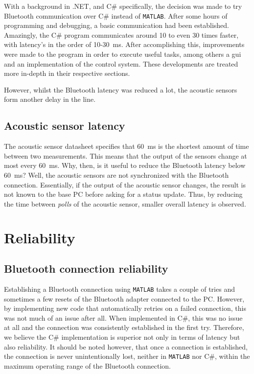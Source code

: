 \documentclass[11pt,titlepage]{report}
\begin{document}
With a background in .NET, and C\# specifically, the decision was made to try Bluetooth communication over C\# instead of \texttt{MATLAB}. After some hours of programming and debugging, a basic communication had been established. Amazingly, the C\# program communicates around 10 to even 30 times faster, with latency's in the order of \num{10}-\SI{30}{ms}. After accomplishing this, improvements were made to the program in order to execute useful tasks, among others a gui and an implementation of the control system. These developments are treated more in-depth in their respective sections.

However, whilst the Bluetooth latency was reduced a lot, the acoustic sensors form another delay in the line.
\subsection{Acoustic sensor latency}
The acoustic sensor datasheet specifies that \SI{60}{ms} is the shortest amount of time between two measurements. This means that the output of the sensors change at most every \SI{60}{ms}. Why, then, is it useful to reduce the Bluetooth latency below \SI{60}{ms}? Well, the acoustic sensors are not synchronized with the Bluetooth connection. Essentially, if the output of the acoustic sensor changes, the result is not known to the base PC before asking for a status update. Thus, by reducing the time between \textit{polls} of the acoustic sensor, smaller overall latency is observed.

\section{Reliability}
\subsection{Bluetooth connection reliability}
Establishing a Bluetooth connection using \texttt{MATLAB} takes a couple of tries and sometimes a few resets of the Bluetooth adapter connected to the PC. However, by implementing new code that automatically retries on a failed connection, this was not much of an issue after all. When implemented in C\#, this was no issue at all and the connection was consistently established in the first try. Therefore, we believe the C\# implementation is superior not only in terms of latency but also reliability. It should be noted however, that once a connection is established, the connection is never unintentionally lost, neither in \texttt{MATLAB} nor C\#, within the maximum operating range of the Bluetooth connection.
\end{document}
